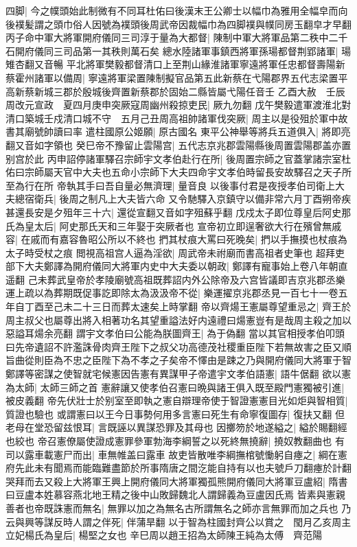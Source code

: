 四脚|{
	今之幞頭始此制微有不同耳杜佑曰後漢末王公卿士以幅巾為雅用全幅皁而向後襆髪謂之頭巾俗人因號為襆頭後周武帝因裁幅巾為四脚襆與幞同房玉翻皁才早翻}
丙子命中軍大將軍開府儀同三司淳于量為大都督|{
	陳制中軍大將軍品第二秩中二千石開府儀同三司品第一其秩則萬石矣}
總水陸諸軍事鎮西將軍孫瑒都督荆郢諸軍|{
	瑒雉杏翻又音暢}
平北將軍樊毅都督清口上至荆山緣淮諸軍寧遠將軍任忠都督壽陽新蔡霍州諸軍以備周|{
	寧遠將軍梁置陳制擬官品第五此新蔡在弋陽郡界五代志梁置平高新蔡新城三郡於殷城後齊置新蔡郡於固始二縣皆屬弋陽任音壬}
乙酉大赦　壬辰周改元宣政　夏四月庚申突厥寇周幽州殺掠吏民|{
	厥九勿翻}
戊午樊毅遣軍渡淮北對清口築城壬戍清口城不守　五月己丑周高祖帥諸軍伐突厥|{
	周主以是役殂於軍中故書其廟號帥讀曰率}
遣柱國原公姬願|{
	原古國名}
東平公神舉等將兵五道俱入|{
	將即亮翻又音如字領也}
癸巳帝不豫留止雲陽宫|{
	五代志京兆郡雲陽縣後周置雲陽郡盖亦置别宫於此}
丙申詔停諸軍驛召宗師宇文孝伯赴行在所|{
	後周置宗師之官蓋掌諸宗室杜佑曰宗師屬天官中大夫也五命小宗師下大夫四命宇文孝伯時留長安故驛召之天子所至為行在所}
帝執其手曰吾自量必無濟理|{
	量音良}
以後事付君是夜授孝伯司衛上大夫總宿衛兵|{
	後周之制凡上大夫皆六命}
又令馳驛入京鎮守以備非常六月丁酉朔帝疾甚還長安是夕殂年三十六|{
	還從宣翻又音如字殂蘇乎翻}
戊戍太子即位尊皇后阿史那氏為皇太后|{
	阿史那氏天和三年娶于突厥者也}
宣帝初立即逞奢欲大行在殯曾無戚容|{
	在戚而有嘉容魯昭公所以不終也}
捫其杖痕大罵曰死晚矣|{
	捫以手撫摸也杖痕為太子時受杖之痕}
閲視高祖宫人逼為淫欲|{
	周武帝未祔廟而書高祖者史筆也}
超拜吏部下大夫鄭譯為開府儀同大將軍内史中大夫委以朝政|{
	鄭譯有寵事始上卷八年朝直遥翻}
己未葬武皇帝於孝陵廟號高祖既葬詔内外公除帝及六宫皆議即吉京兆郡丞樂運上疏以為葬期既促事訖即除太為汲汲帝不從|{
	樂運擢京兆郡丞見一百七十一卷五年自丁酉至己未二十三日而葬太速矣上時掌翻}
帝以齊煬王憲屬尊望重忌之|{
	齊王於周主叔父也屬尊出將入相著功名其望重謚法好内遠禮曰煬憲豈有是哉周主殺之加以惡謚耳煬余亮翻}
謂宇文孝伯曰公能為朕圖齊王|{
	為于偽翻}
當以其官相授孝伯叩頭曰先帝遺詔不許濫誅骨肉齊王陛下之叔父功高德茂社稷重臣陛下若無故害之臣又順旨曲從則臣為不忠之臣陛下為不孝之子矣帝不懌由是踈之乃與開府儀同大將軍于智鄭譯等密謀之使智就宅候憲因告憲有異謀甲子帝遣宇文孝伯語憲|{
	語牛倨翻}
欲以憲為太師|{
	太師三師之首}
憲辭讓又使孝伯召憲曰晩與諸王俱入既至殿門憲獨被引進|{
	被皮義翻}
帝先伏壯士於别室至即執之憲自辯理帝使于智證憲憲目光如炬與智相質|{
	質證也驗也}
或謂憲曰以王今日事勢何用多言憲曰死生有命寧復圖存|{
	復扶又翻}
但老母在堂恐留兹恨耳|{
	言既誣以異謀恐罪及其母也}
因擲笏於地遂縊之|{
	縊於賜翻經也絞也}
帝召憲僚屬使證成憲罪參軍勃海李綱誓之以死終無撓辭|{
	撓奴教翻曲也}
有司以露車載憲尸而出|{
	車無帷盖曰露車}
故吏皆散唯李綱撫棺號慟躬自瘞之|{
	綱在憲府先此未有聞焉而能臨難盡節於所事隋唐之間汔能自持有以也夫號戶刀翻瘞於計翻}
哭拜而去又殺上大將軍王興上開府儀同大將軍獨孤熊開府儀同大將軍豆盧紹|{
	隋書曰豆盧本姓慕容燕北地王精之後中山敗歸魏北人謂歸義為豆盧因氏焉}
皆素與憲親善者也帝既誅憲而無名|{
	無罪以加之為無名古所謂無名之師亦言無罪而加之兵也}
乃云與興等謀反時人謂之伴死|{
	伴蒲旱翻}
以于智為柱國封齊公以賞之　閠月乙亥周主立妃楊氏為皇后|{
	楊堅之女也}
辛巳周以趙王招為太師陳王純為太傅　齊范陽

